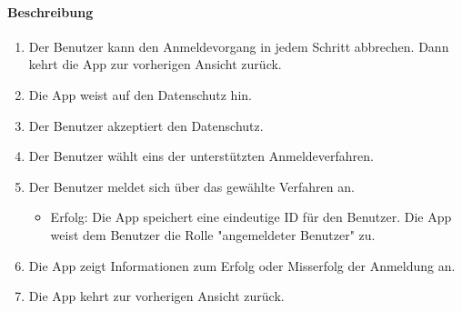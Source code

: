 \paragraph{Beschreibung}
\begin{enumerate}
      \item Der \Gls{Benutzer} kann den Anmeldevorgang in jedem Schritt abbrechen. Dann kehrt die App zur vorherigen Ansicht zurück.
      \item Die App weist auf den Datenschutz hin.
      \item Der \Gls{Benutzer} akzeptiert den Datenschutz.
      \item Der \Gls{Benutzer} wählt eins der unterstützten Anmeldeverfahren.
      \item Der \Gls{Benutzer} meldet sich über das gewählte Verfahren an.
            \begin{itemize}
                  \item{Erfolg:} Die App speichert eine eindeutige \Gls{ID} für den \Gls{Benutzer}. Die App weist dem \Gls{Benutzer} die Rolle "angemeldeter \Gls{Benutzer}" zu.
            \end{itemize}
      \item Die App zeigt Informationen zum Erfolg oder Misserfolg der Anmeldung an.
      \item Die App kehrt zur vorherigen Ansicht zurück. 
\end{enumerate}